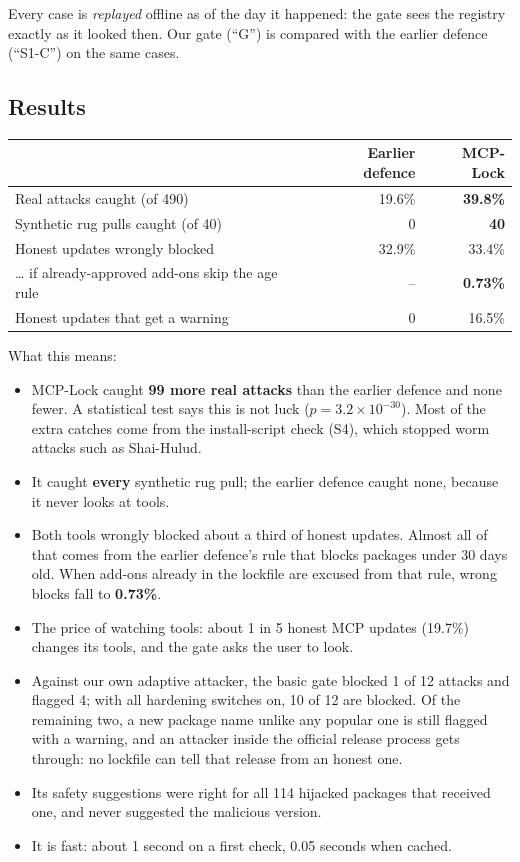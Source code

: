 \documentclass[11pt,a4paper]{article}
\begin{document}
Every case is \emph{replayed} offline as of the day it happened: the gate sees the registry exactly as it looked
then. Our gate (``G'') is compared with the earlier defence (``S1-C'') on the same cases.

\subsection{Results}
\begin{center}
\begin{tabularx}{0.95\textwidth}{@{}Xrr@{}}
\toprule
& \textbf{Earlier defence} & \textbf{MCP-Lock} \\
\midrule
Real attacks caught (of 490) & 19.6\% & \textbf{39.8\%} \\
Synthetic rug pulls caught (of 40) & 0 & \textbf{40} \\
Honest updates wrongly blocked & 32.9\% & 33.4\% \\
\quad \ldots{} if already-approved add-ons skip the age rule & -- & \textbf{0.73\%} \\
Honest updates that get a warning & 0 & 16.5\% \\
\bottomrule
\end{tabularx}
\end{center}

What this means:
\begin{itemize}
  \item MCP-Lock caught \textbf{99 more real attacks} than the earlier defence and none fewer. A statistical test
        says this is not luck ($p = 3.2\times10^{-30}$). Most of the extra catches come from the install-script
        check (S4), which stopped worm attacks such as Shai-Hulud.
  \item It caught \textbf{every} synthetic rug pull; the earlier defence caught none, because it never looks at
        tools.
  \item Both tools wrongly blocked about a third of honest updates. Almost all of that comes from the earlier
        defence's rule that blocks packages under 30 days old. When add-ons already in the lockfile are excused
        from that rule, wrong blocks fall to \textbf{0.73\%}.
  \item The price of watching tools: about 1 in 5 honest MCP updates (19.7\%) changes its tools, and the gate asks
        the user to look.
  \item Against our own adaptive attacker, the basic gate blocked 1 of 12 attacks and flagged 4; with all hardening
        switches on, 10 of 12 are blocked. Of the remaining two, a new package name unlike any popular one is still
        flagged with a warning, and an attacker inside the official release process gets through: no lockfile can
        tell that release from an honest one.
  \item Its safety suggestions were right for all 114 hijacked packages that received one, and never suggested the
        malicious version.
  \item It is fast: about 1 second on a first check, 0.05 seconds when cached.
\end{itemize}
\end{document}
